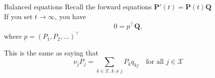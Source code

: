 \documentclass[letterpaper,handout]{beamer}
\def\X{\mathcal{X}}
\begin{document}
\begin{frame}{Balanced equations}
 Recall the forward equations $\mathbf{P}'(t) = \mathbf{P}(t) \mathbf{Q}$ \\
 
 \medskip
 If you set $t \to \infty$, you have 
 \begin{align*}
 	0 = p^\top \mathbf{Q}, 
 \end{align*}
 where $p = (P_1, P_2, \ldots)^\top$
 
 This is the same as saying that 
 $$
\nu_jP_j= \sum_{k\in\X,k\neq j}P_k q_{kj} \quad\mbox{for all }j\in\X
$$
\end{frame}
%
\end{document}
